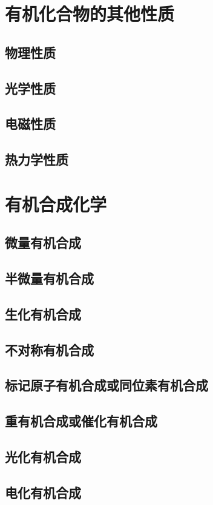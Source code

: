 \documentclass[UTF8]{../03-Chemistry}
\begin{document}
\section{有机化合物的其他性质}
    \subsection{物理性质}
    \subsection{光学性质}
    \subsection{电磁性质}
    \subsection{热力学性质}



\section{有机合成化学}
    \subsection{微量有机合成}
    \subsection{半微量有机合成}
    \subsection{生化有机合成}
    \subsection{不对称有机合成}
    \subsection{标记原子有机合成或同位素有机合成}
    \subsection{重有机合成或催化有机合成}
    \subsection{光化有机合成}
    \subsection{电化有机合成}
\end{document}
